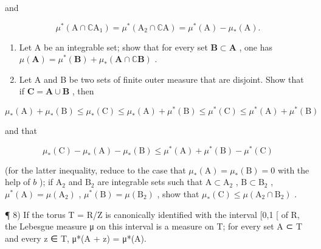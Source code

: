 and

\[
\mu^ {*} (\mathrm{A} \cap \mathbb {C} \mathrm{A} _ {1}) = \mu^ {*} (\mathrm{A} _ {2} \cap \mathbb {C} \mathrm{A}) = \mu^ {*} (\mathrm{A}) - \mu_ {*} (\mathrm{A}).
\]

\begin{enumerate}
\def\labelenumi{\alph{enumi})}
\setcounter{enumi}{2}
\item
  Let A be an integrable set; show that for every set \(\mathbf{B} \subset \mathbf{A}\) , one has \(\mu(\mathbf{A}) = \mu^{*}(\mathbf{B}) + \mu_{*}(\mathbf{A} \cap \mathbb{C}\mathbf{B})\) .
\item
  Let A and B be two sets of finite outer measure that are disjoint. Show that if \(\mathbf{C} = \mathbf{A} \cup \mathbf{B}\) , then
\end{enumerate}

\[
\mu_ {*} (\mathrm{A}) + \mu_ {*} (\mathrm{B}) \leqslant \mu_ {*} (\mathrm{C}) \leqslant \mu_ {*} (\mathrm{A}) + \mu^ {*} (\mathrm{B}) \leqslant \mu^ {*} (\mathrm{C}) \leqslant \mu^ {*} (\mathrm{A}) + \mu^ {*} (\mathrm{B})
\]

and that

\[
\mu_ {*} (\mathrm{C}) - \mu_ {*} (\mathrm{A}) - \mu_ {*} (\mathrm{B}) \leqslant \mu^ {*} (\mathrm{A}) + \mu^ {*} (\mathrm{B}) - \mu^ {*} (\mathrm{C})
\]

(for the latter inequality, reduce to the case that \(\mu_{*}(\mathrm{A}) = \mu_{*}(\mathrm{B}) = 0\) with the help of \(b\) ); if \(\mathrm{A}_2\) and \(\mathrm{B}_2\) are integrable sets such that \(\mathrm{A} \subset \mathrm{A}_2\) , \(\mathrm{B} \subset \mathrm{B}_2\) , \(\mu^{*}(\mathrm{A}) = \mu(\mathrm{A}_2)\) , \(\mu^{*}(\mathrm{B}) = \mu(\mathrm{B}_2)\) , show that \(\mu_{*}(\mathrm{C}) \leqslant \mu(\mathrm{A}_2 \cap \mathrm{B}_2)\) .

¶ 8) If the torus T = R/Z is canonically identified with the interval {[}0,1 {[} of R, the Lebesgue measure μ on this interval is a measure on T; for every set A ⊂ T and every z ∈ T, μ*(A + z) = μ*(A).

